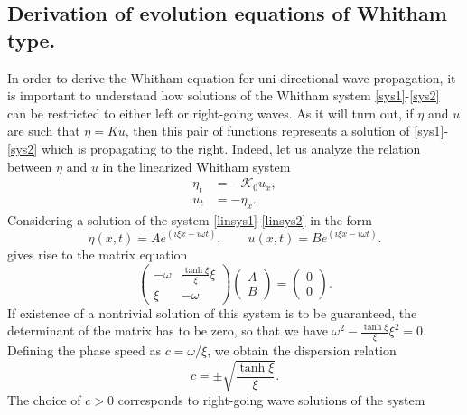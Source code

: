 \subsection{Derivation of evolution equations of Whitham type.}
%
In order to derive the Whitham equation for uni-directional wave propagation,
it is important to understand how solutions of the Whitham system \eqref{sys1}-\eqref{sys2}
can be restricted to either left or right-going waves.
As it will turn out, if  $\eta$ and $u$ are such that $\eta = K u$, 
then this pair of functions represents a solution
of \eqref{sys1}-\eqref{sys2} which is propagating to the right. 
%
Indeed, let us analyze the relation between $\eta$ and $u$ in the linearized Whitham system
\begin{align}
\label{linsys1}
\eta_t & = -  \mathcal{K}_0 u_x, \\
\label{linsys2}
u_t    & = - \eta_x.
\end{align}
%
Considering a solution of the system \eqref{linsys1}-\eqref{linsys2} in the form
\begin{equation}
\eta(x,t) = A e^{(i\xi x - i \omega t)}, \qquad u(x,t) = B e^{(i\xi x - i \omega t)}.
\end{equation}
%
\noindent 
gives rise to the matrix equation
\begin{equation}
\begin{pmatrix}
-\omega & \frac{\tanh{\xi}}{\xi} \xi \\
\xi  & -\omega
\end{pmatrix}
\begin{pmatrix}
A \\
B
\end{pmatrix} =
\begin{pmatrix}
0 \\
0
\end{pmatrix}.
\label{matrix-equation}
\end{equation}
%
If existence of a nontrivial solution of this system is to be guaranteed,
the determinant of the matrix has to be zero, so that we have
$\omega^2 - \frac{\tanh{\xi}}{\xi} \xi^2 = 0$. Defining the phase speed
as $c = \omega / \xi$, we obtain the dispersion relation
\begin{equation}
c = \pm \sqrt{{\textstyle \frac{\tanh{\xi}}{\xi}}}.
\end{equation}
%
%
The choice of $c > 0$ corresponds to right-going wave solutions of the system 
